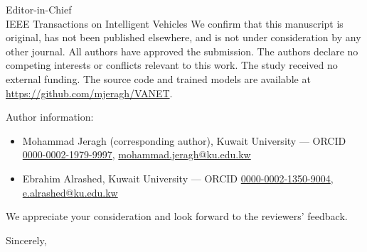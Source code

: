\documentclass[11pt]{letter}
\begin{document}
\begin{letter}{Editor-in-Chief \\ IEEE Transactions on Intelligent Vehicles}
We confirm that this manuscript is original, has not been published elsewhere, and is not under consideration by any other journal. All authors have approved the submission. The authors declare no competing interests or conflicts relevant to this work. The study received no external funding. The source code and trained models are available at \url{https://github.com/mjeragh/VANET}.

Author information:
\begin{itemize}
  \item Mohammad Jeragh (corresponding author), Kuwait University --- ORCID \href{https://orcid.org/0000-0002-1979-9997}{0000-0002-1979-9997}, \href{mailto:mohammad.jeragh@ku.edu.kw}{mohammad.jeragh@ku.edu.kw}
  \item Ebrahim Alrashed, Kuwait University --- ORCID \href{https://orcid.org/0000-0002-1350-9004}{0000-0002-1350-9004}, \href{mailto:e.alrashed@ku.edu.kw}{e.alrashed@ku.edu.kw}
\end{itemize}

We appreciate your consideration and look forward to the reviewers' feedback.

\closing{Sincerely,}

\end{letter}
\end{document}
